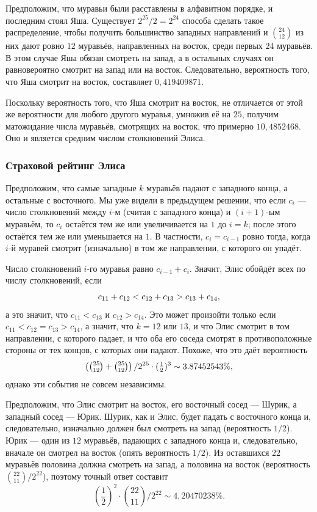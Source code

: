 Предположим, что муравьи были расставлены в алфавитном порядке, и последним стоял Яша.
Существует $2^{25}/2=2^{24}$ способа сделать такое распределение, чтобы получить большинство западных направлений и $\binom{24}{12}$
из них дают ровно $12$ муравьёв, направленных на восток, среди первых $24$ муравьёв.
В этом случае Яша обязан смотреть на запад,
а в остальных случаях он равновероятно смотрит на запад или на восток.
Следовательно, вероятность того, что Яша смотрит на восток, составляет
$0{,}419409871$.

Поскольку вероятность того, что Яша смотрит на восток, не отличается от этой же вероятности для любого другого муравья, умножив её на $25$, получим матожидание числа муравьёв, смотрящих на восток, что примерно $10{,}4852468$.
Оно и является средним числом столкновений Элиса.

\subsubsection*{Страховой рейтинг Элиса}

Предположим, что самые западные $k$ муравьёв падают с западного конца,
а остальные с восточного.
Мы уже видели в предыдущем решении, что если $c_i$ --- число столкновений между $i$-м (считая с западного конца) и $(i + 1)$-ым муравьём, то $c_i$ остаётся тем же или увеличивается на $1$ до $i = k$; после этого остаётся тем же или уменьшается на $1$.
В частности, $c_i=c_{i-1}$ ровно тогда, когда $i$-й муравей смотрит (изначально) в том же направлении, с которого он упадёт.

Число столкновений $i$-го муравья равно $c_{i-1}+c_{i}$.
Значит, Элис обойдёт всех по числу столкновений, если 
\[c_{11}+c_{12}\z<c_{12}\z+c_{13}\z>c_{13}\z+c_{14},\]
а это значит, что  $c_{11}<c_{13}$ и $c_{12}>c_{14}$.
Это может произойти только если 
$c_{11}<c_{12}=c_{13}>c_{14}$,
а значит, что $k = 12$ или $13$, и что Элис смотрит в том направлении, с которого падает,
и что оба его соседа смотрят в противоположные стороны от тех концов, с которых они падают.
Похоже, что это даёт вероятность 
\[\left(\tbinom{25}{12}+\tbinom{25}{12}\right)/2^{25}\cdot (\tfrac12)^3\sim 3.87452543\%,\]
однако эти события не совсем независимы.

Предположим, что Элис смотрит на восток, его восточный сосед --- Шурик, а западный сосед --- Юрик.
Шурик, как и Элис, будет падать с восточного конца и, следовательно, изначально должен был смотреть на запад (вероятность $1/2$).
Юрик --- один из $12$ муравьёв, падающих с западного конца и, следовательно, вначале он смотрел на восток (опять вероятность $1/2$).
Из оставшихся 22 муравьёв половина должна смотреть на запад, а половина на восток (вероятность $\binom{22}{11}/2^{22}$), поэтому точный ответ составит
\[\left(\frac12\right)^2\cdot\binom{22}{11}/2^{22}\sim 4{,}20470238\%.\]

